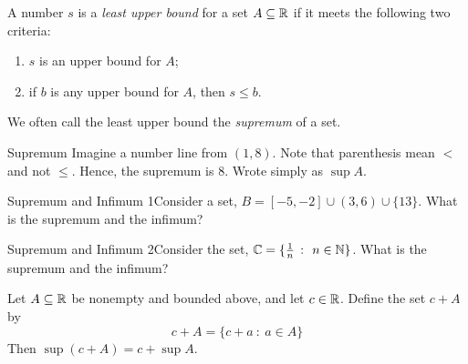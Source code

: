 \begin{definition}
    A number \(s\) is a \textit{least upper bound} for a set \(A \subseteq \mathbb{R}\) if it meets the following two criteria:
    \begin{enumerate}[label=(\roman*)]
        \item \(s\) is an upper bound for \(A\);
        \item if \(b\) is any upper bound for \(A\), then \(s \leq b\).
    \end{enumerate}
\end{definition}

We often call the least upper bound the \textit{supremum} of a set. 

\begin{example}
    {Supremum} Imagine a number line from \((1,8)\). Note that parenthesis mean \(<\) and not \(\leq\). Hence, the supremum is \(8\). Wrote simply as \(\sup A\).
\end{example}




\begin{example}
    {Supremum and Infimum 1}Consider a set, \(B = [-5,-2] \cup (3,6) \cup \{13\}\). What is the supremum and the infimum?
\end{example}


\begin{example}
    {Supremum and Infimum 2}Consider the set, \(\mathbb{C} = \{\frac{1}{n} \ \colon \ n \in \mathbb{N}\}\). What is the supremum and the infimum?
\end{example}


\begin{example}
    Let \(A \subseteq \mathbb{R}\) be nonempty and bounded above, and let \(c \in \mathbb{R}\). Define the set \(c + A\) by \[c + A = \{c+a \ \colon \ a \in A\}\] Then \(\sup(c + A) = c + \sup A\).
\end{example}


